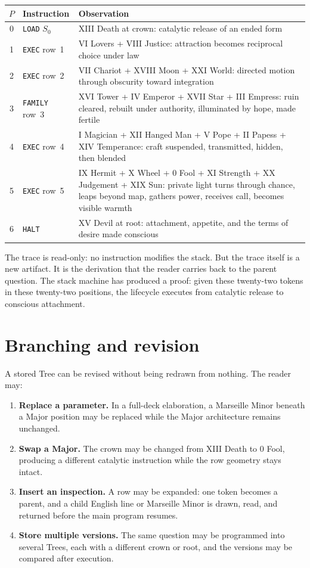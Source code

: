 \begin{center}
\begin{longtable}{clp{8cm}}
\toprule
$P$ & Instruction & Observation \\
\midrule
\endhead
0 & \texttt{LOAD} $S_0$ & XIII Death at crown: catalytic release of an ended form \\
1 & \texttt{EXEC} row~1 & VI Lovers + VIII Justice: attraction becomes reciprocal choice under law \\
2 & \texttt{EXEC} row~2 & VII Chariot + XVIII Moon + XXI World: directed motion through obscurity toward integration \\
3 & \texttt{FAMILY} row~3 & XVI Tower + IV Emperor + XVII Star + III Empress: ruin cleared, rebuilt under authority, illuminated by hope, made fertile \\
4 & \texttt{EXEC} row~4 & I Magician + XII Hanged Man + V Pope + II Papess + XIV Temperance: craft suspended, transmitted, hidden, then blended \\
5 & \texttt{EXEC} row~5 & IX Hermit + X Wheel + 0 Fool + XI Strength + XX Judgement + XIX Sun: private light turns through chance, leaps beyond map, gathers power, receives call, becomes visible warmth \\
6 & \texttt{HALT} & XV Devil at root: attachment, appetite, and the terms of desire made conscious \\
\bottomrule
\end{longtable}
\end{center}

The trace is read-only: no instruction modifies the stack. But the trace itself
is a new artifact. It is the derivation that the reader carries back to the
parent question. The stack machine has produced a proof: given these twenty-two
tokens in these twenty-two positions, the lifecycle executes from catalytic
release to conscious attachment.

\section{Branching and revision}

A stored Tree can be revised without being redrawn from nothing. The reader may:

\begin{enumerate}
\item \textbf{Replace a parameter.} In a full-deck elaboration, a Marseille Minor
      beneath a Major position may be replaced while the Major architecture
      remains unchanged.
\item \textbf{Swap a Major.} The crown may be changed from XIII Death to 0 Fool,
      producing a different catalytic instruction while the row geometry stays
      intact.
\item \textbf{Insert an inspection.} A row may be expanded: one token becomes a
      parent, and a child English line or Marseille Minor is drawn, read, and
      returned before the main program resumes.
\item \textbf{Store multiple versions.} The same question may be programmed into
      several Trees, each with a different crown or root, and the versions may
      be compared after execution.
\end{enumerate}

